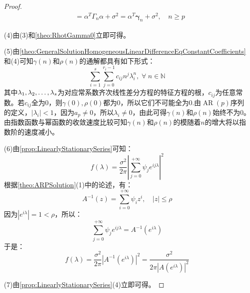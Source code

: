 \begin{proof}
\begin{align*}
		&=\alpha^T\Gamma_n\alpha+\sigma^2=\alpha^T\boldsymbol{\gamma}_n+\sigma^2,\quad n\geqslant p
	\end{align*}\par
	(4)由(3)和\cref{theo:RhotGamma0}立即可得。\par
	(5)由\cref{theo:GeneralSolutionHomogeneousLinearDifferenceEqConstantCoefficients}和(4)可知$\gamma(n)$和$\rho(n)$的通解都具有如下形式：
	\begin{equation*}
		\sum_{i=1}^{s}\sum_{j=0}^{r_i-1}c_{ij}n^{j}\lambda_i^n,\;\forall\;n\in\mathbb{N}
	\end{equation*}
	其中$\lambda_1, \lambda_2, \dots, \lambda_{s}$为对应常系数齐次线性差分方程的特征方程的根，$c_{ij}$为任意常数。若$c_{ij}$全为$0$，则$\gamma(0),\rho(0)$都为$0$，所以它们不可能全为$0$.由$\operatorname{AR}(p)$序列的定义，$|\lambda_i|<1$，因为$a_p\ne0$，所以$\lambda_i\ne0$，由此可得$\gamma(n)$和$\rho(n)$始终不为$0$。由指数函数与幂函数的收敛速度比较可知$\gamma(n)$和$\rho(n)$的模随着$n$的增大将以指数阶的速度减小。\par
	(6)由\cref{prop:LinearlyStationarySeries}可知：
	\begin{equation*}
		f(\lambda)=\frac{\sigma^2}{2\pi}\left|\sum_{j=0}^{+\infty}\psi_je^{ij\lambda}\right|^2
	\end{equation*}
	根据\cref{theo:ARPSolution}(1)中的论述，有：
	\begin{equation*}
		A^{-1}(z)=\sum_{i=0}^{+\infty}\psi_iz^i,\quad|z|\leqslant\rho
	\end{equation*}
	因为$|e^{i\lambda}|=1<\rho$，所以：
	\begin{equation*}
		\sum_{j=0}^{+\infty}\psi_je^{ij\lambda}=A^{-1}(e^{i\lambda})
	\end{equation*}
	于是：
	\begin{equation*}
		f(\lambda)=\frac{\sigma^2}{2\pi}\left|A^{-1}(e^{i\lambda})\right|^2=\frac{\sigma^2}{2\pi|A(e^{i\lambda})|^2}
	\end{equation*}\par
	(7)由\cref{prop:LinearlyStationarySeries}(4)立即可得。
\end{proof}

